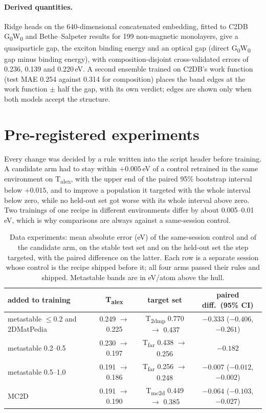 \documentclass[11pt]{article}
\begin{document}
\paragraph{Derived quantities.} Ridge heads on the 640-dimensional concatenated
embedding, fitted to C2DB G\textsubscript{0}W\textsubscript{0} and Bethe--Salpeter results
for 199 non-magnetic monolayers, give a quasiparticle gap, the exciton binding energy
and an optical gap (direct G\textsubscript{0}W\textsubscript{0} gap minus binding energy),
with composition-disjoint cross-validated errors of 0.236, 0.139 and 0.220\,eV. A
second ensemble trained on C2DB's work function (test MAE 0.254 against 0.314 for
composition) places the band edges at the work function $\pm$ half the gap, with its own
verdict; edges are shown only when both models accept the structure.

\section{Pre-registered experiments}\label{sec:experiments}

Every change was decided by a rule written into the script header before training. A
candidate arm had to stay within $+0.005$\,eV of a control retrained in the same
environment on T\textsubscript{alex}, with the upper end of the paired 95\% bootstrap
interval below $+0.015$, and to improve a population it targeted with the whole interval
below zero, while no held-out set got worse with its whole interval above zero. Two
trainings of one recipe in different environments differ by about 0.005--0.01\,eV, which
is why comparisons are always against a same-session control.

\begin{table}[t]
\centering
\caption{Data experiments: mean absolute error (eV) of the same-session control and of
the candidate arm, on the stable test set and on the held-out set the step targeted,
with the paired difference on the latter. Each row is a separate session whose control
is the recipe shipped before it; all four arms passed their rules and shipped.
Metastable bands are in eV/atom above the hull.}
\label{tab:experiments}
\small
\begin{tabular}{lccc}
\toprule
added to training & T\textsubscript{alex} & target set & paired diff.\ (95\% CI) \\
\midrule
metastable $\le$0.2 and 2DMatPedia & 0.249 $\to$ 0.225 & T\textsubscript{2dmp} 0.770 $\to$ 0.437 & $-0.333$ ($-0.406$, $-0.261$) \\
metastable 0.2--0.5 & 0.230 $\to$ 0.197 & T\textsubscript{far} 0.438 $\to$ 0.256 & $-0.182$ \\
metastable 0.5--1.0 & 0.191 $\to$ 0.186 & T\textsubscript{far} 0.256 $\to$ 0.248 & $-0.007$ ($-0.012$, $-0.002$) \\
MC2D & 0.191 $\to$ 0.190 & T\textsubscript{mc2d} 0.449 $\to$ 0.385 & $-0.064$ ($-0.103$, $-0.027$) \\
\bottomrule
\end{tabular}
\end{table}
\end{document}
